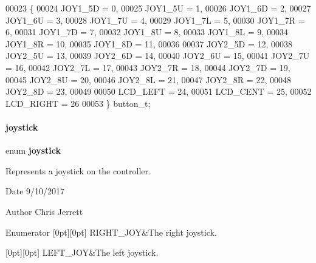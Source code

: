 \begin{DoxyCode}
00023              \{
00024   JOY1_5D = 0,
00025   JOY1_5U = 1,
00026   JOY1_6D = 2,
00027   JOY1_6U = 3,
00028   JOY1_7U = 4,
00029   JOY1_7L = 5,
00030   JOY1_7R = 6,
00031   JOY1_7D = 7,
00032   JOY1_8U = 8,
00033   JOY1_8L = 9,
00034   JOY1_8R = 10,
00035   JOY1_8D = 11,
00036 
00037   JOY2_5D = 12,
00038   JOY2_5U = 13,
00039   JOY2_6D = 14,
00040   JOY2_6U = 15,
00041   JOY2_7U = 16,
00042   JOY2_7L = 17,
00043   JOY2_7R = 18,
00044   JOY2_7D = 19,
00045   JOY2_8U = 20,
00046   JOY2_8L = 21,
00047   JOY2_8R = 22,
00048   JOY2_8D = 23,
00049 
00050   LCD_LEFT = 24,
00051   LCD_CENT = 25,
00052   LCD_RIGHT = 26
00053 \} button_t;
\end{DoxyCode}
\mbox{\label{a00011_ac365c9e892abe4a1b85ae8f56a4eae5a}} 
\paragraph{joystick}
{\footnotesize\ttfamily enum \textbf{ joystick}}



Represents a joystick on the controller. 

\begin{DoxyDate}{Date}
9/10/2017 
\end{DoxyDate}
\begin{DoxyAuthor}{Author}
Chris Jerrett 
\end{DoxyAuthor}
\begin{DoxyEnumFields}{Enumerator}
[0pt][0pt]{}\mbox{\label{a00011_ac365c9e892abe4a1b85ae8f56a4eae5aae08a2d362c677f96f72d93047513cafe}} 
R\+I\+G\+H\+T\+\_\+\+J\+OY&The right joystick. \\
\hline

[0pt][0pt]{}\mbox{\label{a00011_ac365c9e892abe4a1b85ae8f56a4eae5aaf822d7888862e67a3c624775b85c50a9}} 
L\+E\+F\+T\+\_\+\+J\+OY&The left joystick. \\
\hline

\end{DoxyEnumFields}



